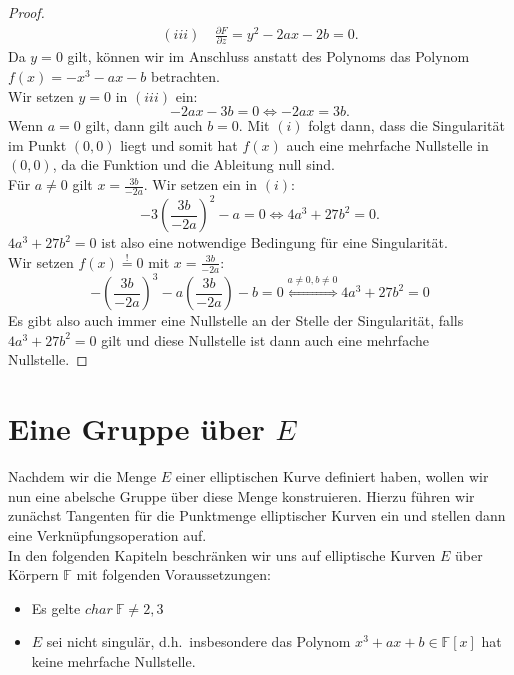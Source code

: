 \documentclass[hidelinks]{article}
\theoremstyle{plain}
\theoremstyle{definition}
\theoremstyle{rem}
\begin{document}
\begin{sloppypar}
\begin{proof}
\begin{equation*}
\begin{split}
	    (iii) \: & \frac{\partial F}{\partial z}  = y^2 - 2ax - 2b = 0.
        \end{split}
    \end{equation*}
    Da $y=0$ gilt, können wir im Anschluss anstatt des Polynoms  das Polynom $f(x)=-x^3 - ax - b$ betrachten.\\ 
    Wir setzen $y=0$ in $(iii)$ ein:
    \begin{equation*}
        -2ax - 3b = 0 \Leftrightarrow -2ax = 3b.
    \end{equation*}
    Wenn $a=0$ gilt, dann gilt auch $b=0$. Mit $(i)$ folgt dann, dass die Singularität im Punkt $(0,0)$ liegt und somit hat $f(x)$ auch eine mehrfache Nullstelle in $(0,0)$, da die Funktion und die Ableitung null sind. \\
    Für $a \neq 0$ gilt $x= \frac{3b}{-2a}$. Wir setzen ein in $(i)$:
    \begin{equation*}
        -3 \left(\frac{3b}{-2a}\right)^2 - a = 0 \Leftrightarrow 4a^3 + 27b^2 = 0.
    \end{equation*}
    $4a^3 + 27b^2 = 0$ ist also eine notwendige Bedingung für eine Singularität. \\
    Wir setzen $f(x) \stackrel{!}{=} 0$ mit $x= \frac{3b}{-2a}$:
    \begin{equation*}
	    -\left(\frac{3b}{-2a}\right)^3 - a \left(\frac{3b}{-2a}\right) - b = 0 \stackrel{a\ne 0, b\ne 0}{\Leftrightarrow} 4a^3+27b^2 = 0
    \end{equation*}
    Es gibt also auch immer eine Nullstelle an der Stelle der Singularität, falls $4a^3 + 27b^2 = 0$ gilt und diese Nullstelle ist dann auch eine mehrfache Nullstelle.
\end{proof}


\section{Eine Gruppe über $E$}
Nachdem wir die Menge $E$ einer elliptischen Kurve definiert haben, wollen wir nun eine abelsche Gruppe über diese Menge konstruieren. Hierzu führen wir zunächst Tangenten für die Punktmenge elliptischer Kurven ein und stellen dann eine Verknüpfungsoperation auf.\\

In den folgenden Kapiteln beschränken wir uns auf elliptische Kurven $E$ über Körpern $\mathbb{F}$ mit folgenden Voraussetzungen:
\begin{itemize}
    \item Es gelte $char\ \mathbb{F}\ne2,3$
    \item $E$ sei nicht singulär, d.h.\ insbesondere das Polynom $x^3+ax+b\in\mathbb{F}[x]$ hat keine mehrfache Nullstelle.
\end{itemize}


\end{sloppypar}
\end{document}

